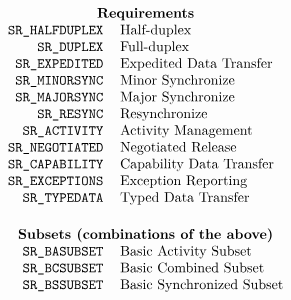 
\normalsize
\[\begin{tabular}{rl}
	\multicolumn{2}{c}{\bf Requirements}\\
\tt SR\_HALFDUPLEX&	Half-duplex\\
\tt SR\_DUPLEX&		Full-duplex\\
\tt SR\_EXPEDITED&	Expedited Data Transfer\\
\tt SR\_MINORSYNC&	Minor Synchronize\\
\tt SR\_MAJORSYNC&	Major Synchronize\\
\tt SR\_RESYNC&		Resynchronize\\
\tt SR\_ACTIVITY&	Activity Management\\
\tt SR\_NEGOTIATED&	Negotiated Release\\
\tt SR\_CAPABILITY&	Capability Data Transfer\\
\tt SR\_EXCEPTIONS&	Exception Reporting\\
\tt SR\_TYPEDATA&	Typed Data Transfer\\[0.2in]
	\multicolumn{2}{c}{\bf Subsets (combinations of the above)}\\
\tt SR\_BASUBSET&	Basic Activity Subset\\
\tt SR\_BCSUBSET&	Basic Combined Subset\\
\tt SR\_BSSUBSET&	Basic Synchronized Subset
\end{tabular}\]
